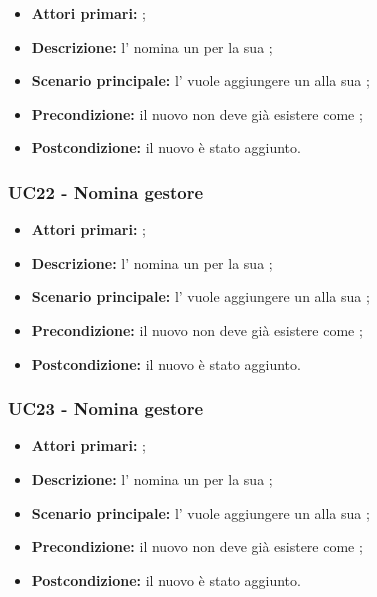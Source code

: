 \documentclass[casi-duso]{subfiles}
\begin{document}
\begin{itemize}
  \item \textbf{Attori primari:} ;
  \item \textbf{Descrizione:} l'  nomina un  per la sua ;
  \item \textbf{Scenario principale:} l'  vuole aggiungere un  alla sua ;
  \item \textbf{Precondizione:} il nuovo  non deve già esistere come ;
  \item \textbf{Postcondizione:} il nuovo  è stato aggiunto.

\end{itemize}


\subsubsection{UC22 - Nomina gestore}
\label{subsub:UC22}

\begin{itemize}
  \item \textbf{Attori primari:} ;
  \item \textbf{Descrizione:} l'  nomina un  per la sua ;
  \item \textbf{Scenario principale:} l'  vuole aggiungere un  alla sua ;
  \item \textbf{Precondizione:} il nuovo  non deve già esistere come ;
  \item \textbf{Postcondizione:} il nuovo  è stato aggiunto.

\end{itemize}


\subsubsection{UC23 - Nomina gestore}
\label{subsub:UC23}

\begin{itemize}
  \item \textbf{Attori primari:} ;
  \item \textbf{Descrizione:} l'  nomina un  per la sua ;
  \item \textbf{Scenario principale:} l'  vuole aggiungere un  alla sua ;
  \item \textbf{Precondizione:} il nuovo  non deve già esistere come ;
  \item \textbf{Postcondizione:} il nuovo  è stato aggiunto.

\end{itemize}
\end{document}
